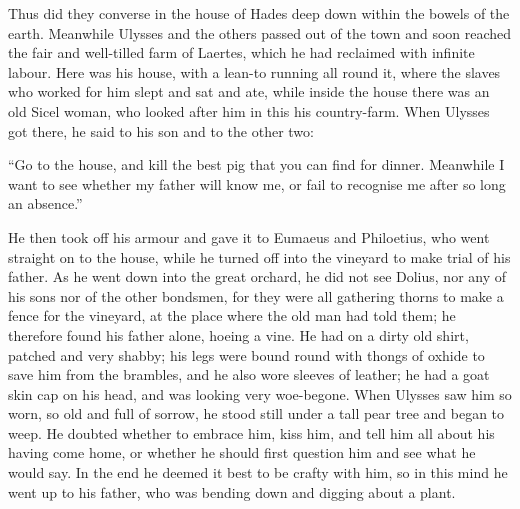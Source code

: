Thus did they converse in the house of Hades deep down within the bowels of the
earth. Meanwhile Ulysses and the others passed out of the town and soon reached
the fair and well-tilled farm of Laertes, which he had reclaimed with infinite
labour. Here was his house, with a lean-to running all round it, where the
slaves who worked for him slept and sat and ate, while inside the house there
was an old Sicel woman, who looked after him in this his country-farm. When
Ulysses got there, he said to his son and to the other two:

“Go to the house, and kill the best pig that you can find for dinner. Meanwhile
I want to see whether my father will know me, or fail to recognise me after so
long an absence.”

He then took off his armour and gave it to Eumaeus and Philoetius, who went
straight on to the house, while he turned off into the vineyard to make trial
of his father. As he went down into the great orchard, he did not see Dolius,
nor any of his sons nor of the other bondsmen, for they were all gathering
thorns to make a fence for the vineyard, at the place where the old man had
told them; he therefore found his father alone, hoeing a vine. He had on a
dirty old shirt, patched and very shabby; his legs were bound round with thongs
of oxhide to save him from the brambles, and he also wore sleeves of leather;
he had a goat skin cap on his head, and was looking very woe-begone. When
Ulysses saw him so worn, so old and full of sorrow, he stood still under a tall
pear tree and began to weep. He doubted whether to embrace him, kiss him, and
tell him all about his having come home, or whether he should first question
him and see what he would say. In the end he deemed it best to be crafty with
him, so in this mind he went up to his father, who was bending down and digging
about a plant.

